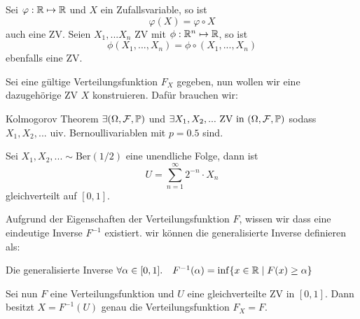 
Sei $\varphi: \mathbb{R} \mapsto \mathbb{R}$ und $X$ ein Zufallsvariable, so ist 
$$\varphi(X) = \varphi \circ X$$ 
auch eine ZV. Seien $X_1,...X_n$ ZV mit $\phi: \mathbb{R}^n \mapsto \mathbb{R}$, so ist 
$$\phi(X_1, ..., X_n) = \phi \circ (X_1,...,X_n)$$
ebenfalls eine ZV.





Sei eine gültige Verteilungsfunktion $F_X$ gegeben, nun wollen wir eine dazugehörige ZV $X$ konstruieren. Dafür brauchen wir: \medskip

\begin{mainbox}
    {Kolmogorov Theorem}
    $\exists (\Omega, \mathcal{F}, \mathbb{P})$ und $\exists X_1, X_2, ... \text{ ZV in } (\Omega, \mathcal{F}, \mathbb{P})$ sodass $X_1, X_2, ...$ uiv. Bernoullivariablen mit $p = 0.5$ sind.
\end{mainbox}

Sei $X_1, X_2,... \sim \text{Ber}(1/2)$ eine unendliche Folge, dann ist 
$$U = \sum_{n = 1}^\infty 2^{-n}\cdot X_n$$ 
gleichverteilt auf $[0,1]$. \medskip

Aufgrund der Eigenschaften der Verteilungsfunktion $F$, wissen wir dass eine eindeutige Inverse $F^{-1}$ existiert. wir können die generalisierte Inverse definieren als: 
\begin{subbox}{Die generalisierte Inverse}
$\forall \alpha \in [0,1]. \quad F^{-1}(\alpha) = \inf \{x \in \mathbb{R} \; | \; F(x) \geq \alpha\}$
\end{subbox}

Sei nun $F$ eine Verteilungsfunktion und $U$ eine gleichverteilte ZV in $[0,1]$. Dann besitzt $X = F^{-1}(U)$ genau die Verteilungsfunktion $F_X = F$. 